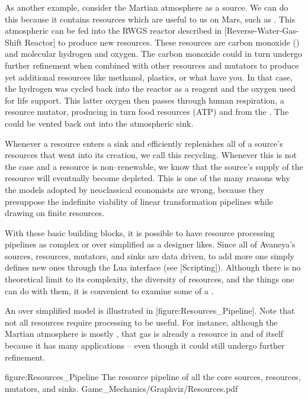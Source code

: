 As another example, consider the Martian atmosphere as a source. We can do this because it contains resources which are useful to us on Mars, such as . This atmospheric  can be fed into the RWGS reactor described in [Reverse-Water-Gas-Shift Reactor] to produce new resources. These resources are carbon monoxide () and molecular hydrogen and oxygen. The carbon monoxide could in turn undergo further refinement when combined with other resources and mutators to produce yet additional resources like methanol, plastics, or what have you. In that case, the hydrogen was cycled back into the reactor as a reagent and the oxygen used for life support. This latter oxygen then passes through human respiration, a resource mutator, producing in turn food resources (ATP) and  from the . The  could be vented back out into the atmospheric sink.

Whenever a resource enters a sink and efficiently replenishes all of a source's resources that went into its creation, we call this recycling. Whenever this is not the case and a resource is non--renewable, we know that the source's supply of the resource will eventually become depleted. This is one of the many reasons why the models adopted by neoclassical economists are wrong, because they presuppose the indefinite viability of linear transformation pipelines while drawing on finite resources.

With these basic building blocks, it is possible to have resource processing pipelines as complex or over simplified as a designer likes. Since all of Avaneya's sources, resources, mutators, and sinks are data driven, to add more one simply defines new ones through the Lua interface (see [Scripting]). Although there is no theoretical limit to its complexity, the diversity of resources, and the things one can do with them, it is convenient to examine some of a .

An over simplified model is illustrated in [figure:Resources_Pipeline]. Note that not all resources require processing to be useful. For instance, although the Martian atmosphere is mostly , that gas is already a resource in and of itself because it has many applications -- even though it could still undergo further refinement.

\FullPageDiagram
    {figure:Resources_Pipeline}
    {The resource pipeline of all the core sources, resources, mutators, and sinks.}
    {Game_Mechanics/Graphviz/Resources.pdf}

